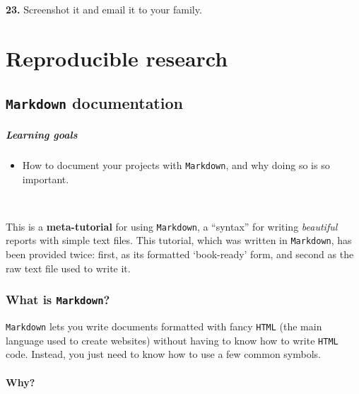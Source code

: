 \documentclass[
]{book}
\providecommand{\tightlist}{%
  \setlength{\itemsep}{0pt}\setlength{\parskip}{0pt}}
\begin{document}
\textbf{23.} Screenshot it and email it to your family.

\hypertarget{part-reproducible-research}{%
\part{Reproducible research}\label{part-reproducible-research}}

\hypertarget{markdown-documentation}{%
\chapter{\texorpdfstring{\texttt{Markdown} documentation}{Markdown documentation}}\label{markdown-documentation}}

\hypertarget{learning-goals-10}{%
\subsubsection*{Learning goals}\label{learning-goals-10}}

\begin{itemize}
\tightlist
\item
  How to document your projects with \texttt{Markdown}, and why doing so is so important.
\end{itemize}

~

This is a \textbf{meta-tutorial} for using \texttt{Markdown}, a ``syntax'' for writing
\emph{beautiful} reports with simple text files. This tutorial, which was written
in \texttt{Markdown}, has been provided twice: first, as its formatted `book-ready'
form, and second as the raw text file used to write it.

\hypertarget{what-is-markdown}{%
\section*{\texorpdfstring{What is \texttt{Markdown}?}{What is Markdown?}}\label{what-is-markdown}}

\texttt{Markdown} lets you write documents formatted with fancy \texttt{HTML} (the main
language used to create websites) without having to know how to write \texttt{HTML}
code. Instead, you just need to know how to use a few common symbols.

\hypertarget{why}{%
\subsection*{Why?}\label{why}}
\end{document}
